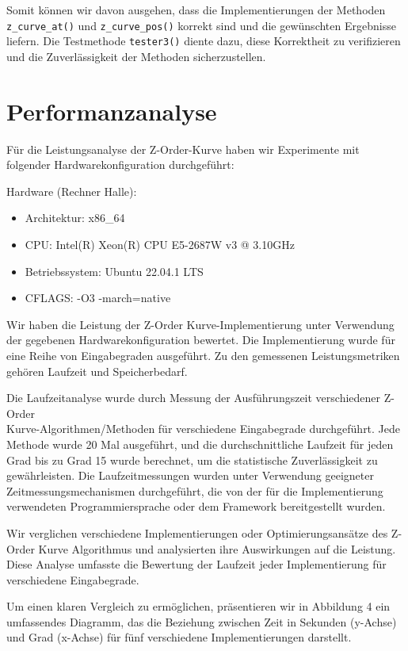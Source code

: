 \documentclass[course=erap]{aspdoc}
\begin{document}
\noindent Somit können wir davon ausgehen, dass die Implementierungen der Methoden\\ \texttt{z\_curve\_at()} und \texttt{z\_curve\_pos()} korrekt sind und die gewünschten Ergebnisse liefern. Die Testmethode \texttt{tester3()} diente dazu, diese Korrektheit zu verifizieren und die Zuverlässigkeit der Methoden sicherzustellen.


\section{Performanzanalyse}

\noindent Für die Leistungsanalyse der Z-Order-Kurve haben wir Experimente mit folgender Hardwarekonfiguration durchgeführt:

Hardware (Rechner Halle):
\begin{itemize}
  \item Architektur: x86\_64
  \item CPU: Intel(R) Xeon(R) CPU E5-2687W v3 @ 3.10GHz
  \item Betriebssystem: Ubuntu 22.04.1 LTS
  \item CFLAGS: -O3 -march=native
\end{itemize}

\noindent Wir haben die Leistung der Z-Order Kurve-Implementierung unter Verwendung der gegebenen Hardwarekonfiguration bewertet. Die Implementierung wurde für eine Reihe von Eingabegraden ausgeführt. Zu den gemessenen Leistungsmetriken gehören Laufzeit und Speicherbedarf.

\noindent Die Laufzeitanalyse wurde durch Messung der Ausführungszeit verschiedener Z-Order\\ Kurve-Algorithmen/Methoden für verschiedene Eingabegrade durchgeführt. Jede Methode wurde 20 Mal ausgeführt, und die durchschnittliche Laufzeit für jeden Grad bis zu Grad 15 wurde berechnet, um die statistische Zuverlässigkeit zu gewährleisten. Die Laufzeitmessungen wurden unter Verwendung geeigneter Zeitmessungsmechanismen durchgeführt, die von der für die Implementierung verwendeten Programmiersprache oder dem Framework bereitgestellt wurden.

\noindent Wir verglichen verschiedene Implementierungen oder Optimierungsansätze des Z-Order Kurve Algorithmus und analysierten ihre Auswirkungen auf die Leistung. Diese Analyse umfasste die Bewertung der Laufzeit jeder Implementierung für verschiedene Eingabegrade.

\noindent Um einen klaren Vergleich zu ermöglichen, präsentieren wir in Abbildung 4 ein umfassendes Diagramm, das die Beziehung zwischen Zeit in Sekunden (y-Achse) und Grad (x-Achse) für fünf verschiedene Implementierungen darstellt.
\end{document}

